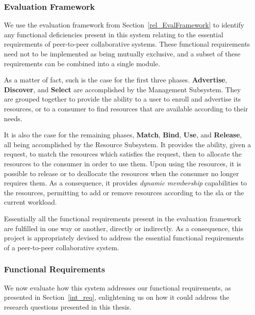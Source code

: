 \documentclass[12pt, titlepage]{uo_temp}
\begin{document}
     \subsubsection{Evaluation Framework}
     We use the evaluation framework from Section~\ref{rel_EvalFramework} to identify any
     functional deficiencies present in this system relating to the essential requirements
     of peer-to-peer collaborative systems. These functional requirements need not to be
     implemented as being mutually exclusive, and a subset of these requirements can be
     combined into a single module.

     As a matter of fact, such is the case for the first three phases. \textbf{Advertise},
     \textbf{Discover}, and \textbf{Select} are accomplished by the Management Subsystem.
     They are grouped together to provide the ability to a user to enroll and
     advertise its resources, or to a consumer to find resources that are available
     according to their needs.

     It is also the case for the remaining phases, \textbf{Match}, \textbf{Bind},
     \textbf{Use}, and \textbf{Release}, all being accomplished by the Resource
     Subsystem. It provides the ability, given a request, to match the resources which
     satisfies the request, then to allocate the resources to the consumer in order to use
     them. Upon using the resources, it is possible to release or to deallocate the
     resources when the consumer no longer requires them. As a consequence, it provides
     \emph{dynamic membership} capabilities to the resources, permitting to add or
     remove resources according to the \gls{sla} or the current workload.

     Essentially all the functional requirements present in the evaluation framework are
     fulfilled in one way or another, directly or indirectly. As a consequence, this
     project is appropriately devised to address the essential functional requirements of
     a peer-to-peer collaborative system.

     \subsubsection{Functional Requirements}
     We now evaluate how this system addresses our functional requirements, as presented in
     Section~\ref{int_req}, enlightening us on how it could address the research questions
     presented in this thesis.
\end{document}
